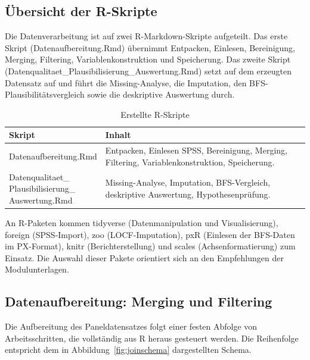 \subsection{Übersicht der R-Skripte}
\label{subsec:rskripte}

Die Datenverarbeitung ist auf zwei R-Markdown-Skripte aufgeteilt. Das erste Skript
(Datenaufbereitung.Rmd) übernimmt Entpacken, Einlesen, Bereinigung, Merging,
Filtering, Variablenkonstruktion und Speicherung. Das zweite Skript
(Datenqualitaet\_\allowbreak Plausibilisierung\_\allowbreak Auswertung.Rmd) setzt auf dem erzeugten
Datensatz auf und führt die Missing-Analyse, die Imputation, den
BFS-Plausibilitätsvergleich sowie die deskriptive Auswertung durch.

\begin{table}[h]
\centering
\caption{Erstellte R-Skripte}
\label{tab:rskripte}
\begin{tabularx}{\textwidth}{lX}
\toprule
Skript & Inhalt \\
\midrule
Datenaufbereitung.Rmd & Entpacken, Einlesen SPSS, Bereinigung, Merging, Filtering, Variablenkonstruktion, Speicherung. \\[4pt]
\makecell[l]{Datenqualitaet\_ \\ Plausibilisierung\_ \\ Auswertung.Rmd} & Missing-Analyse, Imputation, BFS-Vergleich, deskriptive Auswertung, Hypothesenprüfung. \\
\bottomrule
\end{tabularx}
\end{table}

An R-Paketen kommen tidyverse (Datenmanipulation und Visualisierung),
foreign (SPSS-Import), zoo (LOCF-Imputation), pxR (Einlesen
der BFS-Daten im PX-Format), knitr (Berichterstellung) und scales
(Achsenformatierung) zum Einsatz. Die Auswahl dieser Pakete orientiert sich an den
Empfehlungen der Modulunterlagen.



\subsection{Datenaufbereitung: Merging und Filtering}
\label{subsec:merging}

Die Aufbereitung des Paneldatensatzes folgt einer festen Abfolge von Arbeitsschritten,
die vollständig aus R heraus gesteuert werden. Die Reihenfolge entspricht dem in
Abbildung~\ref{fig:joinschema} dargestellten Schema.

